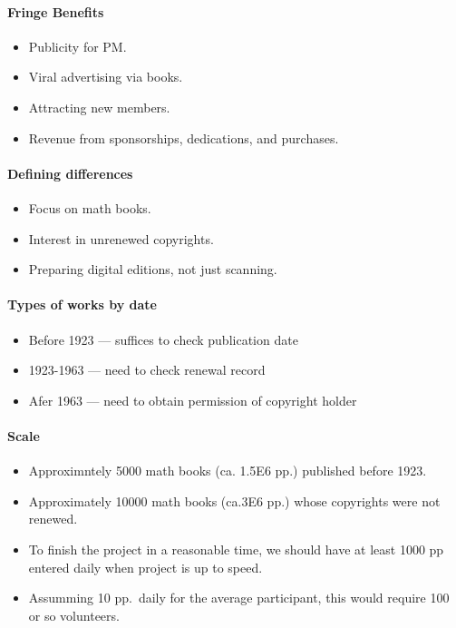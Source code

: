 \paragraph{Fringe Benefits}

\begin{itemize}
\item
  Publicity for PM.
\item
  Viral advertising via books.
\item
  Attracting new members.
\item
  Revenue from sponsorships, dedications, and purchases.
\end{itemize}

\paragraph{Defining differences}

\begin{itemize}
\item
  Focus on math books.
\item
  Interest in unrenewed copyrights.
\item
  Preparing digital editions, not just scanning.
\end{itemize}

\paragraph{Types of works by date}

\begin{itemize}
\item
  Before 1923 --- suffices to check publication date
\item
  1923-1963 --- need to check renewal record
\item
  Afer 1963 --- need to obtain permission of copyright holder
\end{itemize}

\paragraph{Scale}

\begin{itemize}
\item
  Approximntely 5000 math books (ca. 1.5E6 pp.) published before 1923.
\item
  Approximately 10000 math books (ca.3E6 pp.) whose copyrights were not
  renewed.
\item
  To finish the project in a reasonable time, we should have at least
  1000 pp entered daily when project is up to speed.
\item
  Assumming 10 pp.~daily for the average participant, this would require
  100 or so volunteers.
\end{itemize}

